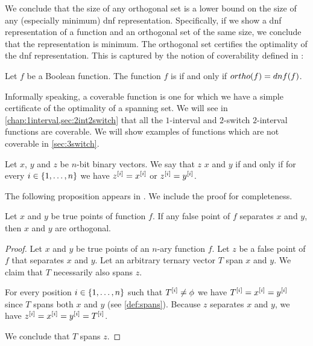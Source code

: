 We conclude that the size of any orthogonal set
is a lower bound on the size of any
(especially minimum)
\acrshort{dnf} representation.
Specifically,
if we show a \acrshort{dnf} representation of a function
and an orthogonal set of the same size,
we conclude that the representation is minimum.
The orthogonal set certifies
the optimality of the \acrshort{dnf} representation.
This is captured by the notion of coverability
defined in \citet{Cepek2012}:
\begin{definition}
\label{def:coverable}
Let $f$ be a Boolean function.
The function $f$ is 
if and only if
$ortho (f) = dnf (f)$.
\end{definition}

Informally speaking,
a coverable function is one for which
we have a simple certificate of the
optimality of a spanning set.
We will see
in \cref{chap:1interval,sec:2int2switch}
that all the $1$-interval
and $2$-switch $2$-interval functions
are coverable.
We will show examples of functions which are not coverable
in \cref{sec:3switch}.

\begin{definition}
\label{def:separatingvector}
Let $x$, $y$ and $z$ be $n$-bit binary vectors.
We say that $z$  $x$ and $y$
if and only if
for every $i \in \{1, \ldots, n\}$
we have
$z^{[i]} = x^{[i]}$ or $z^{[i]} = y^{[i]}$.
\end{definition}

The following proposition appears
in \citet[Lemma 3.7]{Cepek2012}.
We include the proof for completeness.

\begin{theorem}
\label{theorem:separatingfportho}
Let $x$ and $y$ be true points of function $f$.
If any false point of $f$ separates $x$ and $y$,
then $x$ and $y$ are orthogonal.
\end{theorem}

\begin{proof}
Let $x$ and $y$ be true points of an $n$-ary function $f$.
Let $z$ be a false point of $f$
that separates $x$ and $y$.
Let an arbitrary ternary vector $T$ span $x$ and $y$.
We claim that $T$ necessarily also spans $z$.

For every position $i \in \{1, \ldots, n\}$
such that $T^{[i]} \neq \phi$
we have $T^{[i]} = x^{[i]} = y^{[i]}$
since $T$ spans both $x$ and $y$
(see \cref{def:spans}).
Because $z$ separates $x$ and $y$,
we have
$z^{[i]} = x^{[i]} = y^{[i]} = T^{[i]}$.

We conclude that $T$ spans $z$.
\end{proof}

